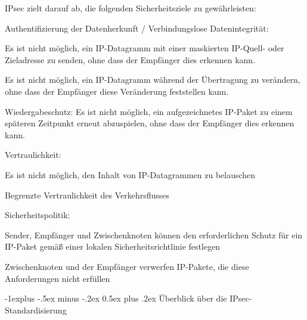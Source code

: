 \documentclass[a4paper]{article}
\makeatletter
\renewcommand{\subsection}{\@startsection{subsection}{2}{0mm}%
 {-1explus -.5ex minus -.2ex}%
 {0.5ex plus .2ex}%
 {\normalfont\normalsize\bfseries}}
\makeatother
\begin{document}
\begin{multicols}{3}
      \begin{itemize*}
            \item
            IPsec zielt darauf ab, die folgenden Sicherheitsziele zu
            gewährleisten:

            \begin{itemize*}
                  \item Authentifizierung der Datenherkunft / Verbindungslose Datenintegrität:
                  \begin{itemize*} \item Es ist nicht möglich, ein IP-Datagramm mit einer maskierten IP-Quell- oder Zieladresse zu senden, ohne dass der Empfänger dies erkennen kann. \item Es ist nicht möglich, ein IP-Datagramm während der Übertragung zu verändern, ohne dass der Empfänger diese Veränderung feststellen kann. \item Wiedergabeschutz: Es ist nicht möglich, ein aufgezeichnetes IP-Paket zu einem späteren Zeitpunkt erneut abzuspielen, ohne dass der Empfänger dies erkennen kann. \end{itemize*}
                  \item Vertraulichkeit:
                  \begin{itemize*} \item Es ist nicht möglich, den Inhalt von IP-Datagrammen zu belauschen \item Begrenzte Vertraulichkeit des Verkehrsflusses \end{itemize*}
            \end{itemize*}
            \item
            Sicherheitspolitik:

            \begin{itemize*}
                  \item Sender, Empfänger und Zwischenknoten können den erforderlichen Schutz für ein IP-Paket gemäß einer lokalen Sicherheitsrichtlinie festlegen
                  \item Zwischenknoten und der Empfänger verwerfen IP-Pakete, die diese Anforderungen nicht erfüllen
            \end{itemize*}
      \end{itemize*}


      \subsection{Überblick über die
            IPsec-Standardisierung}


\end{multicols}
\end{document}
